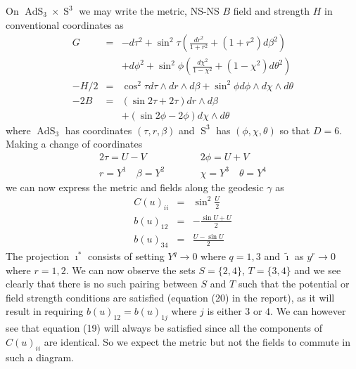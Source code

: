 \documentclass[14pt, a4paper, titlepage]{slides}
\DeclareMathOperator{\AdS}{AdS}
\DeclareMathOperator{\Sphere}{S}
\let\S\Sphere
\begin{document}
On $\AdS_3\times\S^3$ we may write the metric, NS-NS $B$ field and strength $H$
in conventional coordinates as
\begin{eqnarray*}
  G &=& - d\tau^2 + \sin^2{\tau}\left( \frac{dr^2}{1+r^2} +
    \left(1+r^2\right)d\beta^2\right) \\ \nonumber
  &&+d\phi^2+\sin^2{\phi}\left(\frac{d\chi^2}{1-\chi^2}+
    \left(1-\chi^2\right)d\theta^2\right)\\
  -H/2 &=& \cos^2{\tau} d\tau\wedge dr\wedge d\beta + \sin^2{\phi}d\phi\wedge
  d\chi\wedge d\theta\\
  -2B &=& \left(\sin{2\tau}+2\tau\right)dr\wedge d\beta\\
  &&+\left(\sin{2\phi}-2\phi\right)d\chi\wedge d\theta
\end{eqnarray*}
where $\AdS_3$ has coordinates $(\tau,r,\beta)$ and $\S^3$ has
$(\phi,\chi,\theta)$ so that $D=6$. Making a change of coordinates
\begin{eqnarray*}
  2\tau=U-V &\qquad& 2\phi=U+V \\ \nonumber
  r=Y^1\quad\beta=Y^2 &\qquad& \chi=Y^3\quad\theta=Y^4
\end{eqnarray*}
we can now express the metric and fields along the geodesic $\gamma$ as
\begin{eqnarray*}
  C(u)_{ii} &=& \sin^2{\frac{U}{2}} \\ \nonumber
  b(u)_{12}&=&-\frac{\sin{U}+U}{2}\\ \nonumber
  b(u)_{34}&=&\frac{U-\sin{U}}{2}
\end{eqnarray*}
The projection $\imath^*$ consists of setting $Y^q\rightarrow 0$ where $q=1,3$
and $\widetilde{\imath}$ as $y^r\rightarrow 0$ where $r=1,2$. We can now observe
the sets $S=\{2,4\}$, $T=\{3,4\}$ and we see clearly that there is no such
pairing between $S$ and $T$ such that the potential or field strength conditions
are satisfied (equation (20) in the report), as it will result in requiring
$b(u)_{12}=b(u)_{1j}$ where $j$ is either $3$ or $4$. We can however see that
equation (19) will always be satisfied since all the components of $C(u)_{ii}$
are identical. So we expect the metric but not the fields to commute in such a
diagram.
\end{document}
